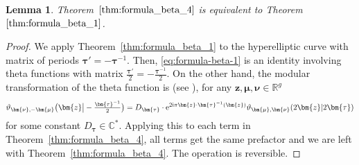 \documentclass[10pt,a4paper]{amsart}
\numberwithin{equation}{section}
\newtheorem{Lemma}[Theorem]{Lemma}
\newcommand{\ee}{\mathrm{e}}
\begin{document}
\begin{Lemma}
Theorem~$\ref{thm:formula_beta_4}$ is equivalent to Theorem~$\ref{thm:formula_beta_1}$.
\end{Lemma}
\begin{proof} We apply Theorem~\ref{thm:formula_beta_1} to the hyperelliptic curve with
 matrix of periods $\bm{\tau}' = -\bm{\tau}^{-1}$. Then, \eqref{eq:formula-beta-1} is an identity
 involving theta functions with matrix
 $\frac{\bm{\tau'}}{2} = -\frac{\bm{\tau}^{-1}}{2}$. On the other hand, the
 modular transformation of the theta function is (see
 \cite[equation~(5.1)]{Tata1}), for any $\bm{z},\bm{\mu},\bm{\nu} \in \mathbb{R}^g$
 \begin{equation*}
 \begin{split}
	 \vartheta_{\bm{\nu}, -\bm{\mu}}\bigl(\bm{z}\big | -\tfrac{\bm{\tau}^{-1}}{2}\bigr) = D_{\bm{\tau}} \cdot \ee^{2{\rm i}\pi \bm{z} \cdot \bm{\tau}^{-1}(\bm{z})} \vartheta_{\bm{\mu}, \bm{\nu}}(2\bm{z} | 2\bm{\tau})
 \end{split}
 \end{equation*}
for some constant $D_{\bm{\tau}} \in \mathbb{C}^*$. Applying this to each term in Theorem~\ref{thm:formula_beta_4}, all terms get the same prefactor and we are left with Theorem~\ref{thm:formula_beta_4}. The operation is reversible.
\end{proof}
\end{document}
